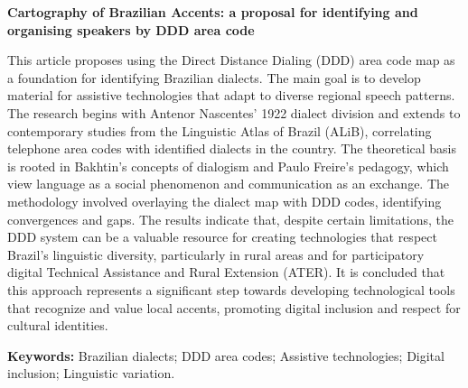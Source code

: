 	\begin{center}
		\textbf{\large Cartography of Brazilian Accents: a proposal for identifying and organising speakers by DDD area code}
	\end{center}	
	\begin{resumo}[Abstract] %
This article proposes using the Direct Distance Dialing (DDD) area code map as a foundation for identifying Brazilian dialects. The main goal is to develop material for assistive technologies that adapt to diverse regional speech patterns. The research begins with Antenor Nascentes' 1922 dialect division and extends to contemporary studies from the Linguistic Atlas of Brazil (ALiB), correlating telephone area codes with identified dialects in the country. The theoretical basis is rooted in Bakhtin's concepts of dialogism and Paulo Freire's pedagogy, which view language as a social phenomenon and communication as an exchange. The methodology involved overlaying the dialect map with DDD codes, identifying convergences and gaps. The results indicate that, despite certain limitations, the DDD system can be a valuable resource for creating technologies that respect Brazil's linguistic diversity, particularly in rural areas and for participatory digital Technical Assistance and Rural Extension (ATER). It is concluded that this approach represents a significant step towards developing technological tools that recognize and value local accents, promoting digital inclusion and respect for cultural identities.
\\[0.5em]

		
		\vspace*{0.5cm}
		
		\noindent\textbf{{Keywords: }}
        Brazilian dialects; DDD area codes; Assistive technologies; Digital inclusion; Linguistic variation.
		
		
	\end{resumo}
	

	
	

	
